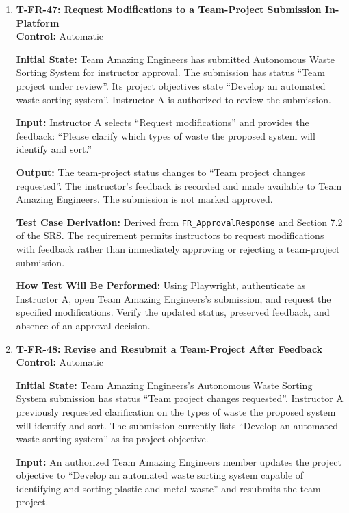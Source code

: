 \documentclass[12pt, titlepage]{article}
\begin{document}
\begin{enumerate}
\item \label{T-FR-47}\textbf{T-FR-47: Request Modifications to a Team-Project Submission In-Platform}\\

\textbf{Control:} Automatic

\textbf{Initial State:} Team Amazing Engineers has submitted Autonomous Waste Sorting System for instructor approval. The submission has status ``Team project under review''. Its project objectives state ``Develop an automated waste sorting system''. Instructor A is authorized to review the submission.

\textbf{Input:} Instructor A selects ``Request modifications'' and provides the feedback: ``Please clarify which types of waste the proposed system will identify and sort.''

\textbf{Output:} The team-project status changes to ``Team project changes requested''. The instructor's feedback is recorded and made available to Team Amazing Engineers. The submission is not marked approved.

\textbf{Test Case Derivation:} Derived from \texttt{FR\_ApprovalResponse} and Section 7.2 of the SRS. The requirement permits instructors to request modifications with feedback rather than immediately approving or rejecting a team-project submission.

\textbf{How Test Will Be Performed:} Using Playwright, authenticate as Instructor A, open Team Amazing Engineers's submission, and request the specified modifications. Verify the updated status, preserved feedback, and absence of an approval decision.

\item \label{T-FR-48}\textbf{T-FR-48: Revise and Resubmit a Team-Project After Feedback}\\

\textbf{Control:} Automatic

\textbf{Initial State:} Team Amazing Engineers's Autonomous Waste Sorting System submission has status ``Team project changes requested''. Instructor A previously requested clarification on the types of waste the proposed system will identify and sort. The submission currently lists ``Develop an automated waste sorting system'' as its project objective.

\textbf{Input:} An authorized Team Amazing Engineers member updates the project objective to ``Develop an automated waste sorting system capable of identifying and sorting plastic and metal waste'' and resubmits the team-project.


\end{enumerate}
\end{document}
